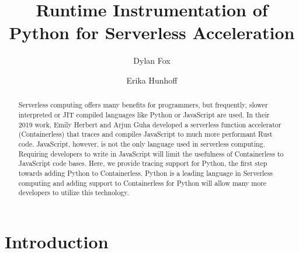 \documentclass[acmsmall,review,authorversion]{acmart}
\begin{document}
\title{Runtime Instrumentation of Python for Serverless Acceleration}

\author{Dylan Fox}
\author{Erika Hunhoff}

\begin{abstract}
     Serverless computing offers many benefits for programmers, but frequently, slower interpreted or JIT compiled languages like Python or JavaScript are used. In their 2019 work, Emily Herbert and Arjun Guha developed a serverless function accelerator (Containerless) that traces and compiles JavaScript to much more performant Rust code. JavaScript, however, is not the only language used in serverless computing. Requiring developers to write in JavaScript will limit the usefulness of Containerless to JavaScript code bases. Here, we provide tracing support for Python, the first step towards adding Python to Containerless. Python is a leading language in Serverless computing and adding support to Containerless for Python will allow many more developers to utilize this technology.
\end{abstract}

\maketitle

\section{Introduction}
\end{document}
